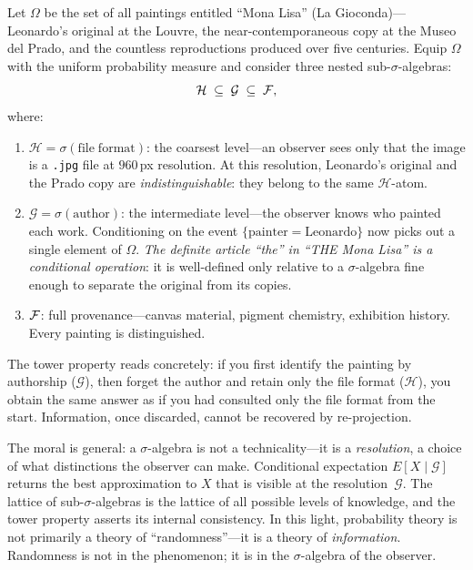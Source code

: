 \begin{example}\label{ex:gioconda}
Let $\Omega$ be the set of all paintings entitled ``Mona Lisa'' (La Gioconda)---Leonardo's original at the Louvre, the near-contemporaneous copy at the Museo del Prado, and the countless reproductions produced over five centuries. Equip $\Omega$ with the uniform probability measure and consider three nested sub-$\sigma$-algebras:
\[
\mathcal{H} \;\subseteq\; \mathcal{G} \;\subseteq\; \mathcal{F},
\]
where:
\begin{enumerate}[label=(\roman*)]
\item $\mathcal{H} = \sigma(\mathrm{file\; format})$: the coarsest level---an observer sees only that the image is a \texttt{.jpg} file at $960$\,px resolution. At this resolution, Leonardo's original and the Prado copy are \emph{indistinguishable}: they belong to the same $\mathcal{H}$-atom.
\item $\mathcal{G} = \sigma(\mathrm{author})$: the intermediate level---the observer knows who painted each work. Conditioning on the event $\{\mathrm{painter} = \text{Leonardo}\}$ now picks out a single element of $\Omega$. \emph{The definite article ``the'' in ``THE Mona Lisa'' is a conditional operation}: it is well-defined only relative to a $\sigma$-algebra fine enough to separate the original from its copies.
\item $\mathcal{F}$: full provenance---canvas material, pigment chemistry, exhibition history. Every painting is distinguished.
\end{enumerate}

The tower property reads concretely: if you first identify the painting by authorship ($\mathcal{G}$), then forget the author and retain only the file format ($\mathcal{H}$), you obtain the same answer as if you had consulted only the file format from the start. Information, once discarded, cannot be recovered by re-projection.

The moral is general: a $\sigma$-algebra is not a technicality---it is a \emph{resolution}, a choice of what distinctions the observer can make. Conditional expectation $E[X \mid \mathcal{G}]$ returns the best approximation to $X$ that is visible at the resolution~$\mathcal{G}$. The lattice of sub-$\sigma$-algebras is the lattice of all possible levels of knowledge, and the tower property asserts its internal consistency. In this light, probability theory is not primarily a theory of ``randomness''---it is a theory of \emph{information}. Randomness is not in the phenomenon; it is in the $\sigma$-algebra of the observer.
\end{example}

